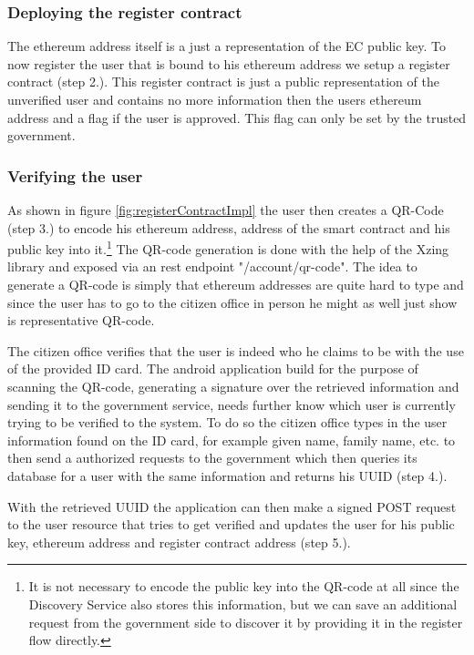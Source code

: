 \subsubsection{Deploying the register contract}
The ethereum address itself is a just a representation of the EC public key. To now register the user that is bound to his ethereum address we setup a register contract (step 2.). This register contract is just a public representation of the unverified user and contains no more information then the users ethereum address and a flag if the user is approved. This flag can only be set by the trusted government. 

\subsubsection{Verifying the user}
As shown in figure \ref{fig:registerContractImpl} the user then creates a QR-Code (step 3.) to encode his ethereum address, address of the smart contract and his public key into it.\footnote{It is not necessary to encode the public key into the QR-code at all since the Discovery Service also stores this information, but we can save an additional request from the government side to discover it by providing it in the register flow directly.} The QR-code generation is done with the help of the Xzing library and exposed via an rest endpoint "/account/qr-code". The idea to generate a QR-code is simply that ethereum addresses are quite hard to type and since the user has to go to the citizen office in person he might as well just show is representative QR-code. 

The citizen office verifies that the user is indeed who he claims to be with the use of the provided ID card. The android application build for the purpose of scanning the QR-code, generating a signature over the retrieved information and sending it to the government service, needs further know which user is currently trying to be verified to the system. To do so the citizen office types in the user information found on the ID card, for example given name, family name, etc. to then send a authorized requests to the government which then queries its database for a user with the same information and returns his UUID (step 4.). 

With the retrieved UUID the application can then make a signed POST request to the user resource that tries to get verified and updates the user for his public key, ethereum address and register contract address (step 5.).

